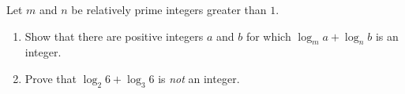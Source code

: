 Let \(m\) and \(n\) be relatively prime integers greater than \(1\).
\begin{enumerate}
\item[(a)] Show that there are positive integers \(a\) and \(b\) for which \(\log_m a+\log_n b\) is an integer.
\item[(b)] Prove that \(\log_2 6+\log_3 6\) is \emph{not} an integer.
\end{enumerate}
